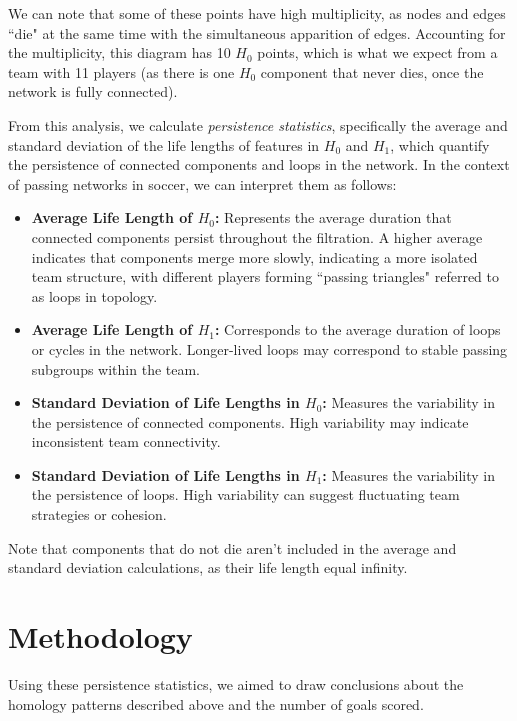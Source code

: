 \documentclass[10pt,twocolumn]{article}
\begin{document}
We can note that some of these points have high multiplicity, as nodes and edges ``die" at the same time with the simultaneous apparition of edges. Accounting for the multiplicity, this diagram has 10 $ H_0 $ points, which is what we expect from a team with 11 players (as there is one $ H_0 $ component that never dies, once the network is fully connected).

From this analysis, we calculate \textit{persistence statistics}, specifically the average and standard deviation of the life lengths of features in $ H_0 $ and $ H_1 $, which quantify the persistence of connected components and loops in the network. In the context of passing networks in soccer, we can interpret them as follows:
    
\begin{itemize}
    \item \textbf{Average Life Length of $ H_0 $:} Represents the average duration that connected components persist throughout the filtration. A higher average indicates that components merge more slowly, indicating a more isolated team structure, with different players forming ``passing triangles" referred to as loops in topology.
    \item \textbf{Average Life Length of $ H_1 $:} Corresponds to the average duration of loops or cycles in the network. Longer-lived loops may correspond to stable passing subgroups within the team.
    \item \textbf{Standard Deviation of Life Lengths in $ H_0 $:} Measures the variability in the persistence of connected components. High variability may indicate inconsistent team connectivity.
    \item \textbf{Standard Deviation of Life Lengths in $ H_1 $:} Measures the variability in the persistence of loops. High variability can suggest fluctuating team strategies or cohesion.
\end{itemize}

Note that components that do not die aren't included in the average and standard deviation calculations, as their life length equal infinity.

\section*{Methodology}

Using these persistence statistics, we aimed to draw conclusions about the homology patterns described above and the number of goals scored. 
\end{document}

